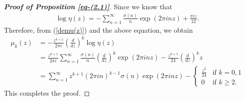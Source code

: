 \documentclass[11pt]{amsart}
\theoremstyle{plain}
\numberwithin{equation}{section}
\begin{document}
	\begin{proof}[\textbf{\boldmath Proof of Proposition \ref{eq-(2.1)}}]
		Since we know that 
		\begin{align}\label{eq-logeta}
			\log \eta(z)=-\sum_{n=1}^{\infty}\frac{\sigma(n)}{n}\exp\left(2\pi inz\right)+\frac{\pi iz}{12}. 
		\end{align}
		Therefore, from (\ref{demu(z)}) and the above equation, we obtain
		\begin{align*}
			\mu_{k}(z)&=-\frac{z^{k+1}}{2\pi i} \left(\frac{d}{dz}\right)^{k} \log\eta(z)\\
			&=\frac{z^{k+1}}{2\pi i}\sum_{n=1}^{\infty}\frac{\sigma(n)}{n} \left(\frac{d}{dz}\right)^{k}\exp(2\pi inz)-\frac{z^{k+1}}{24} \left(\frac{d}{dz}\right)^{k} z\\
			&=\sum_{n=1}^{\infty}z^{k+1}(2\pi in)^{k-1}\sigma(n)\exp(2\pi inz)- \begin{cases} 
				\frac{z^{2}}{24} & \mbox{if } k=0,1 \\ 
				0 & \mbox{if } k\ge 2. 
			\end{cases}
		\end{align*}
		This completes the proof.
	\end{proof}
	
\end{document}
